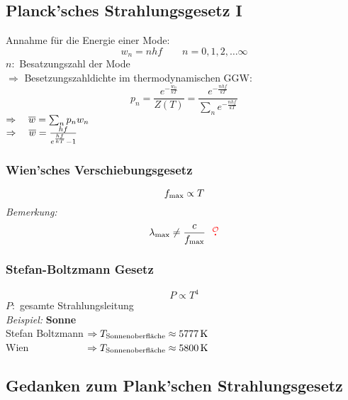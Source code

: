 \subsection{Planck'sches Strahlungsgesetz I}

Annahme für die Energie einer Mode:
\begin{equation*}
w_n = n h f \qquad n = 0,1,2, \dots \infty
\end{equation*}
$ n : $ Besatzungszahl der Mode\\[5pt]
$ \Rightarrow $ Besetzungszahldichte im thermodynamischen GGW:
\begin{equation*}
p_n = \frac{e^{-\frac{w_n}{kT}}}{Z(T)} = \frac{e^{-\frac{n h f}{k T}}}{\sum_n e^{-\frac{nhf}{kT}}}
\end{equation*}
$ \Rightarrow \quad \overline{w} = \sum_n p_n w_n $\\[5pt]
$ \Rightarrow \quad \overline{w} = \frac{hf}{e^{\frac{hf}{kT}} - 1} $
\noindent
{}

\subsubsection{Wien'sches Verschiebungsgesetz}

$$ f_{\textrm{max}} \propto T $$
\emph{Bemerkung:}
\begin{equation*}
\lambda_{\tx{max}} \neq \frac{c}{f_{\tx{max}}} \ \ \color{red} \tx{\mau} \color{black}
\end{equation*}

\subsubsection{Stefan-Boltzmann Gesetz}

$$ P \propto T^4 $$
$ P : $ gesamte Strahlungsleitung\\[10pt]
\emph{Beispiel:} \textbf{Sonne}\\[5pt]
Stefan Boltzmann $ \Rightarrow T_{\textrm{Sonnenoberfläche}} \approx 5777 \, \textrm{K} $\\
Wien $ \quad \ \: \qquad \qquad \Rightarrow T_{\textrm{Sonnenoberfläche}} \approx 5800 \, \textrm{K} $

\subsection{Gedanken zum Plank'schen Strahlungsgesetz}

